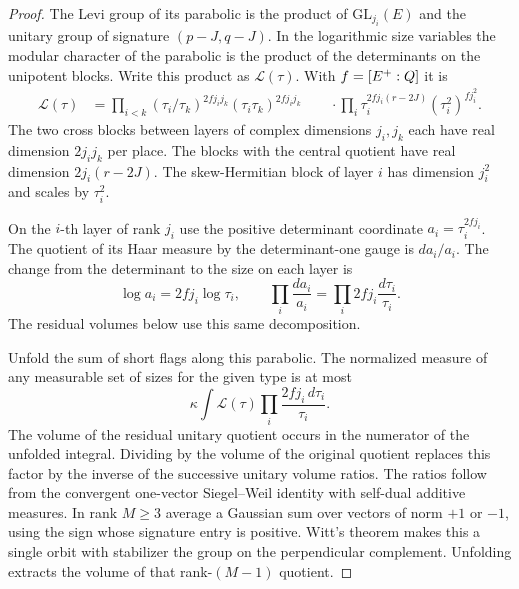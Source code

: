 \begin{proof}
The Levi group of its parabolic is the product of
\(\mathrm{GL}_{j_i}(E)\) and the unitary group of signature
\((p-J,q-J)\). In the logarithmic size variables the modular
character of the parabolic is the product of the determinants
on the unipotent blocks. Write this product as \(\mathcal L(\tau)\).
With \(f=[E^+:Q]\) it is
\begin{align*}
 \mathcal L(\tau)
 &=\prod_{i<k}(\tau_i/\tau_k)^{2fj_i j_k}
               (\tau_i\tau_k)^{2fj_i j_k}\
 &\hspace{1em}\cdot\prod_i \tau_i^{2fj_i(r-2J)}
                                  (\tau_i^2)^{fj_i^2}.
\end{align*}
The two cross blocks between layers of complex dimensions
\(j_i,j_k\) each have real dimension \(2j_i j_k\) per place.
The blocks with the central quotient have real dimension
\(2j_i(r-2J)\). The skew-Hermitian block of layer \(i\) has
dimension \(j_i^2\) and scales by \(\tau_i^2\).

On the \(i\)-th layer of rank \(j_i\) use the positive determinant
coordinate \(a_i=\tau_i^{2fj_i}\). The quotient of its Haar
measure by the determinant-one gauge is \(da_i/a_i\).
The change from the determinant to the size on each layer is
\[
 \log a_i=2fj_i\log\tau_i,\qquad
 \prod_i\frac{da_i}{a_i}=\prod_i 2fj_i\frac{d\tau_i}{\tau_i}.
\]
The residual volumes below use this same decomposition.

Unfold the sum of short flags along this parabolic. The
normalized measure of any measurable set of sizes for the
given type is at most
\begin{equation}\label{eq:count-flag-density-product}
              \kappa\int\mathcal L(\tau)
                                   \prod_i \frac{2f j_i\,d\tau_i}{\tau_i}.
\end{equation}
The volume of the residual unitary quotient occurs in the
numerator of the unfolded integral. Dividing by the volume
of the original quotient replaces this factor by the inverse
of the successive unitary volume ratios. The ratios follow
from the convergent one-vector Siegel--Weil identity with
self-dual additive measures. In rank \(M\ge3\) average a
Gaussian sum over vectors of norm \(+1\) or \(-1\), using
the sign whose signature entry is positive. Witt's theorem
makes this a single orbit with stabilizer the group on
the perpendicular complement. Unfolding extracts the
volume of that rank-\((M-1)\) quotient.


\end{proof}
